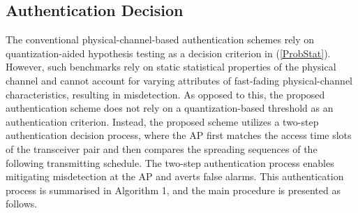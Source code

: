 \documentclass[journal,10pt]{IEEEtran}
\begin{document}
\subsection{Authentication Decision}
The conventional physical-channel-based authentication schemes rely on quantization-aided hypothesis testing as a decision criterion in (\ref{ProbStat}). However, such benchmarks rely on static statistical properties of the physical channel and cannot account for varying attributes of fast-fading physical-channel characteristics, resulting in misdetection. As opposed to this, the proposed authentication scheme does not rely on a quantization-based threshold as an authentication criterion. Instead, the proposed scheme utilizes a two-step authentication decision process, where the AP first matches the access time slots of the transceiver pair and then compares the spreading sequences of the following transmitting schedule. The two-step authentication process enables mitigating misdetection at the AP and averts false alarms. This authentication process is summarised in Algorithm 1, and the main procedure is presented as follows.
\end{document}
